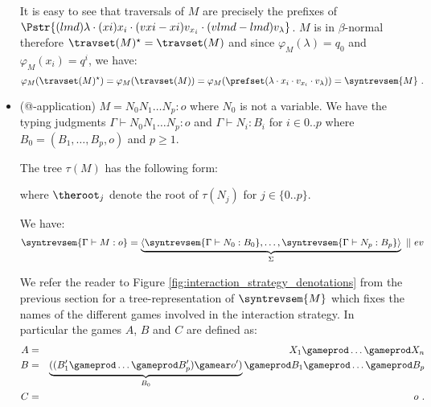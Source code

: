 \begin{itemize}[$\bullet$]
        It is easy to see that traversals of $M$ are precisely
        the prefixes of $ \Pstr{ (lmd)\lambda \cdot (xi){x_i}
        \cdot (vxi-xi){v_{x_i}} \cdot (vlmd-lmd){v_{\lambda}}}$.
        $M$ is in $\beta$-normal therefore $\travset(M)^\star =
        \travset(M)$ and since $\varphi_M(\lambda) = q_0$ and
        $\varphi_M(x_i) = q^i$, we have:
        $$ \varphi_M(\travset(M)^\star) = \varphi_M(\travset(M)) = \varphi_M(\prefset( \lambda \cdot x_i \cdot v_{x_i} \cdot v_{\lambda}))
         = \syntrevsem{M} \ .
        $$


    \item (@-application) $M = N_0 N_1 \ldots N_p :o$ where $N_0$ is not a variable.
    We have the typing judgments $\Gamma \vdash N_0 N_1 \ldots
    N_p : o$ and $\Gamma \vdash N_i : B_i$ for $i\in 0..p$ where
    $B_0 = (B_1,\ldots,B_p,o)$ and $p\geq 1$.

    The tree $\tau(M)$ has the following form:
\begin{center}
\end{center}
    where $\theroot_j$ denote the root of $\tau(N_j)$ for $j\in
    \{0..p\}$.

    We have:
    $$
    \syntrevsem{\Gamma \vdash M : o}
            =  \underbrace{\langle \syntrevsem{\Gamma \vdash N_0 : B_0}, \ldots, \syntrevsem{\Gamma \vdash N_p : B_p} \rangle}_{\Sigma}\ \| \ ev
    $$

    We refer the reader to Figure \ref{fig:interaction_strategy_denotations} from the previous section for a tree-representation of $\syntrevsem{M}$ which fixes the names of the different games involved in the interaction strategy. In particular the games $A$, $B$ and $C$ are defined as:
    \begin{eqnarray*}
        A &=& X_1 \gameprod \ldots \gameprod X_n\\
        B &=& \underbrace{((B_1' \gameprod \ldots \gameprod B_p') \gamear o')}_{B_0} \gameprod B_1 \gameprod \ldots \gameprod B_p\\
        C &=& o \ .
    \end{eqnarray*}



\end{itemize}
